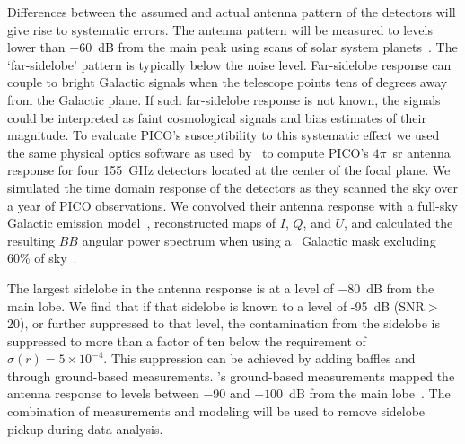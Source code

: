 \documentclass[PICOReport.tex]{subfiles}
\begin{document}
Differences between the assumed and actual antenna pattern of the detectors will give rise to systematic errors. The antenna pattern will be measured to levels lower than $-60$~dB from the main peak using scans of solar system planets~\citep{tauber2018}. The `far-sidelobe' pattern is typically below the noise level. Far-sidelobe response can couple to bright Galactic signals when the telescope points tens of degrees away from the Galactic plane. If such far-sidelobe response is not known, the signals could be interpreted as faint cosmological signals and bias estimates of their magnitude. To evaluate PICO's susceptibility to this systematic effect we used the same physical optics software as used by \planck\ to compute PICO's $4\pi$~sr antenna response for four 155~GHz detectors located at the center of the focal plane. We simulated the time domain response of the detectors as they scanned the sky over a year of PICO observations. We convolved their antenna response with a full-sky Galactic emission model~\citep{thorne2018_pysm}, reconstructed maps of $I$, $Q$, and $U$, and calculated the resulting $BB$ angular power spectrum when using a \planck\ Galactic mask excluding 60\% of sky~\citep{planck_2013_xv}. 

The largest sidelobe in the antenna response is at a level of $-80$~dB from the main lobe. We find that if that sidelobe is known to a level of -95~dB (\ac{SNR}$>$20), or further suppressed to that level, the contamination from the sidelobe is suppressed to more than a factor of ten below the requirement of $\sigma(r) = 5 \times 10^{-4}$. This suppression can be achieved by adding baffles and through ground-based measurements. \planck 's ground-based measurements mapped the antenna response to levels between $-90$ and $-100$~dB from the main lobe~\citep{planck_sidelobes}. The combination of measurements and modeling will be used to remove sidelobe pickup during data analysis. 
 
\end{document}
